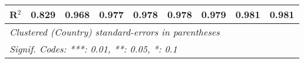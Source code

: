 \begin{table}[htbp]
\begin{tabular}{lcccccccc}
      R$^2$                                                                           & 0.829   & 0.968   & 0.977          & 0.978          & 0.978          & 0.979          & 0.981          & 0.981\\  
      \midrule
      \multicolumn{9}{l}{\emph{Clustered (Country) standard-errors in parentheses}}\\
      \multicolumn{9}{l}{\emph{Signif. Codes: ***: 0.01, **: 0.05, *: 0.1}}\\
   \end{tabular}
\end{table}


